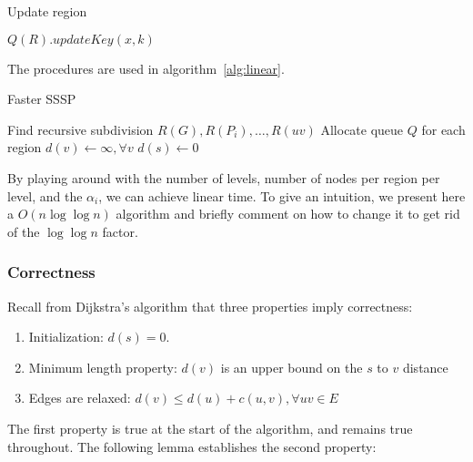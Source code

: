 \documentclass[12pt]{article}
\begin{document}
\begin{algorithm}
  \caption{Update region}
  \label{alg:update}
  \begin{algorithmic}[1]
      \State $Q(R).updateKey(x,k)$
        \State {}
      \EndIf
    \EndProcedure
  \end{algorithmic}
\end{algorithm}

The procedures are used in algorithm~\ref{alg:linear}.

\begin{algorithm}
  \label{alg:linear}
  \caption{Faster SSSP}
  \begin{algorithmic}[1]
    \State Find recursive subdivision $R(G), R(P_i), \ldots, R(uv)$
    \State Allocate queue $Q$ for each region
    \State $d(v) \gets \infty, \forall v$
    \State $d(s) \gets 0$
      \State {}
    \EndFor
      \State {}
    \EndWhile
  \end{algorithmic}
\end{algorithm}

By playing around with the number of levels, number of nodes per region per level, and the $\alpha_i$, we can achieve linear time. To give an intuition, we present here a $O(n \log \log n)$ algorithm and briefly comment on how to change it to get rid of the $\log \log n$ factor.

\subsubsection{Correctness}
\label{sec:correctness}

Recall from Dijkstra's algorithm that three properties imply correctness:
\begin{enumerate}
\item Initialization: $d(s) = 0$.
\item Minimum length property: $d(v)$ is an upper bound on the $s$ to $v$ distance
\item Edges are relaxed: $d(v) \leq d(u) + c(u,v), \forall uv \in E$
\end{enumerate}

The first property is true at the start of the algorithm, and remains true throughout. The following lemma establishes the second property:\\
\end{document}
